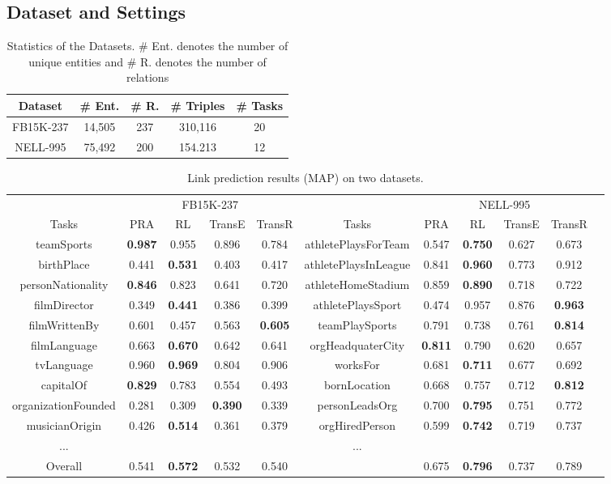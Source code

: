 \documentclass[11pt,letterpaper]{article}
\begin{document}
\subsection{Dataset and Settings}
\begin{table}[h!]
\small
\centering
 \begin{tabular}{||c c c c c||} 
 \hline
 Dataset & \# Ent. & \# R. & \# Triples & \# Tasks\\ 
 \hline\hline
FB15K-237 & 14,505 & 237 & 310,116 & 20 \\ 
 NELL-995 & 75,492 & 200 & 154.213 & 12\\
 \hline
 \end{tabular}
 \caption{Statistics of the Datasets. \# Ent. denotes the number of unique entities and \# R. denotes the number of relations}
 \label{stats}
\end{table}


\begin{table*}[h]
\centering
\small
\begin{tabular}{ccccccccccc}\toprule
& \multicolumn{4}{c}{FB15K-237} & & \multicolumn{4}{c}{NELL-995} \\
\cmidrule{2-5} \cmidrule{7-10}
Tasks & PRA & RL & TransE & TransR & Tasks & PRA & RL & TransE & TransR \\ \midrule
teamSports & \textbf{0.987} & 0.955 & 0.896 & 0.784& athletePlaysForTeam & 0.547 &\textbf{0.750} & 0.627 & 0.673\\
birthPlace & 0.441 & \textbf{0.531} & 0.403 & 0.417 & athletePlaysInLeague & 0.841 & \textbf{0.960} & 0.773 & 0.912\\
personNationality & \textbf{0.846} & 0.823 & 0.641 & 0.720 & athleteHomeStadium & 0.859 & \textbf{0.890} & 0.718 & 0.722\\
filmDirector & 0.349 & \textbf{0.441} & 0.386 & 0.399 & athletePlaysSport& 0.474& 0.957 & 0.876 & \textbf{0.963}\\
filmWrittenBy & 0.601 & 0.457 & 0.563 & \textbf{0.605} & teamPlaySports& 0.791& 0.738 & 0.761 & \textbf{0.814}\\
filmLanguage & 0.663 & \textbf{0.670} & 0.642 & 0.641 & orgHeadquaterCity& \textbf{0.811}& 0.790 & 0.620 & 0.657 \\ 
tvLanguage & 0.960 & \textbf{0.969} & 0.804 & 0.906 & worksFor & 0.681 & \textbf{0.711} & 0.677 & 0.692 \\
capitalOf & \textbf{0.829} & 0.783 & 0.554 & 0.493 &bornLocation & 0.668 & 0.757 & 0.712 & \textbf{0.812}\\
organizationFounded & 0.281 & 0.309 & \textbf{0.390} & 0.339 & personLeadsOrg & 0.700 &\textbf{0.795} & 0.751 & 0.772\\
musicianOrigin & 0.426 & \textbf{0.514} & 0.361 & 0.379 & orgHiredPerson & 0.599 & \textbf{0.742} & 0.719 & 0.737 \\
... & &  & & & ...\\
\midrule
Overall & 0.541 & \textbf{0.572} & 0.532 & 0.540 &  & 0.675& \textbf{0.796} & 0.737 & 0.789\\
\bottomrule
\end{tabular}
\caption{Link prediction results (MAP) on two datasets.}
\label{result1}
\end{table*}
\end{document}
